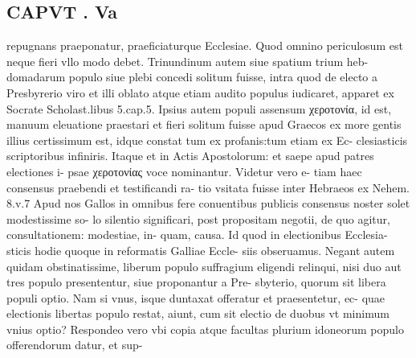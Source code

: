 \documentclass{article}
\begin{document}
\begin{pages}
\section*{CAPVT . Va }
\marginpar{[ p.355 ]}\pstart repugnans praeponatur, praeficiaturque Ecclesiae. Quod omnino periculosum est neque fieri vllo modo debet. Trinundinum autem siue spatium trium heb- domadarum populo siue plebi concedi solitum fuisse, intra quod de electo a Presbyrerio viro et illi oblato atque etiam audito populus iudicaret, apparet ex Socrate Scholast.libus  5.cap.5. Ipsius autem populi assensum χεροτονία, id est, manuum eleuatione praestari et fieri solitum fuisse apud Graecos ex more gentis illius certissimum est, idque constat tum ex profanis:tum etiam ex Ec- clesiasticis scriptoribus infiniris. Itaque et in Actis Apostolorum: et saepe apud patres electiones i- psae χεροτονίας voce nominantur. Videtur vero e- tiam haec consensus praebendi et testificandi ra- tio vsitata fuisse inter Hebraeos ex Nehem. 8.v.7 Apud nos Gallos in omnibus fere conuentibus publicis consensus noster solet modestissime so- lo silentio significari, post propositam negotii, de quo agitur, consultationem: modestiae, in- quam, causa. Id quod in electionibus Ecclesia- sticis hodie quoque in reformatis Galliae Eccle- siis obseruamus. Negant autem quidam obstinatissime, liberum populo suffragium eligendi relinqui, nisi duo aut tres populo presententur, siue proponantur a Pre- sbyterio, quorum sit libera populi optio. Nam si vnus, isque duntaxat offeratur et praesentetur, ec- quae electionis libertas populo restat, aiunt, cum sit electio de duobus vt minimum vnius optio? Respondeo vero vbi copia atque facultas plurium idoneorum populo offerendorum datur, et sup-  \pend

\end{pages}
\end{document}
